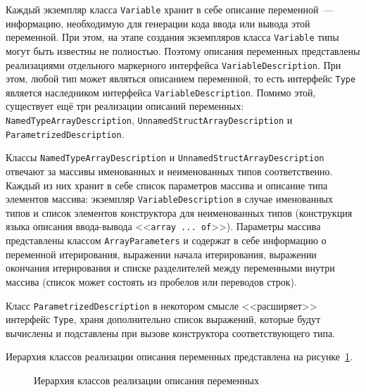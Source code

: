 \documentclass[times,specification,annotation]{style/itmo-student-thesis/itmo-student-thesis}
\begin{document}
Каждый экземпляр класса \texttt{Variable} хранит в себе описание переменной~--- информацию, необходимую для генерации кода ввода или вывода этой переменной. При этом, на этапе создания экземпляров класса \texttt{Variable} типы могут быть известны не полностью. Поэтому описания переменных представлены реализациями отдельного маркерного интерфейса \texttt{VariableDescription}. При этом, любой тип может являться описанием переменной, то есть интерфейс \texttt{Type} является наследником интерфейса \texttt{VariableDescription}. Помимо этой, существует ещё три реализации описаний переменных: \texttt{NamedTypeArrayDescription}, \texttt{UnnamedStructArrayDescription} и \texttt{ParametrizedDescription}.

Классы \texttt{NamedTypeArrayDescription} и \texttt{UnnamedStructArrayDescription} отвечают за массивы именованных и неименованных типов соответственно. Каждый из них хранит в себе список параметров массива и описание типа элементов массива: экземпляр \texttt{VariableDescription} в случае именованных типов и список элементов конструктора для неименованных типов (конструкция языка описания ввода-вывода <<\texttt{array ... of}>>). Параметры массива представлены классом \texttt{ArrayParameters} и содержат в себе информацию о переменной итерирования, выражении начала итерирования, выражении окончания итерирования и списке разделителей между переменными внутри массива (список может состоять из пробелов или переводов строк).

Класс \texttt{ParametrizedDescription} в некотором смысле <<расширяет>> интерфейс \texttt{Type}, храня дополнительно список выражений, которые будут вычислены и подставлены при вызове конструктора соответствующего типа.

Иерархия классов реализации описания переменных представлена на рисунке~\ref{descriptions-classes-hierarchy}.

\begin{figure}[!h]
\caption{Иерархия классов реализации описания переменных}\label{descriptions-classes-hierarchy}
\centering
{}
\end{figure}
\end{document}
